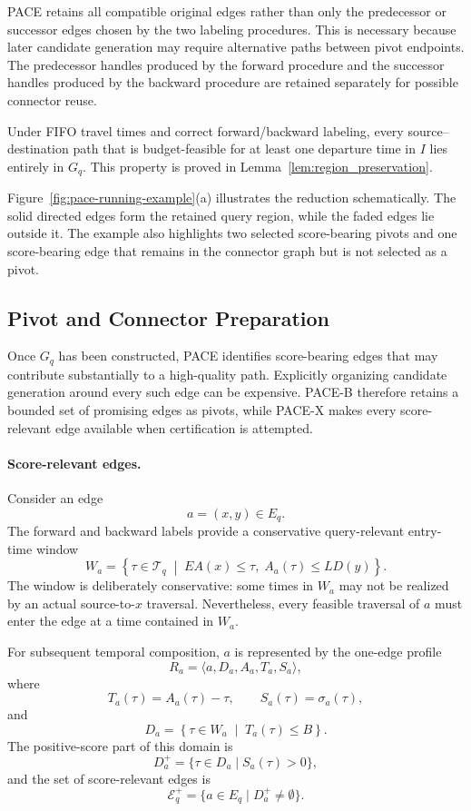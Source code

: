 \documentclass[a4paper,fleqn]{cas-dc}
\begin{document}
PACE retains all compatible original edges rather than only the predecessor
or successor edges chosen by the two labeling procedures. This is necessary
because later candidate generation may require alternative paths between
pivot endpoints. The predecessor handles produced by the forward procedure
and the successor handles produced by the backward procedure are retained
separately for possible connector reuse.

Under FIFO travel times and correct forward/backward labeling, every
source--destination path that is budget-feasible for at least one departure
time in \(I\) lies entirely in \(G_q\). This property is proved in
Lemma~\ref{lem:region_preservation}.

Figure~\ref{fig:pace-running-example}(a) illustrates the reduction
schematically. The solid directed edges form the retained query region, while
the faded edges lie outside it. The example also highlights two selected
score-bearing pivots and one score-bearing edge that remains in the connector
graph but is not selected as a pivot.

\subsection{Pivot and Connector Preparation}
\label{subsec:pace_pivots_connectors}

Once \(G_q\) has been constructed, PACE identifies score-bearing edges that
may contribute substantially to a high-quality path. Explicitly organizing
candidate generation around every such edge can be expensive. PACE-B therefore
retains a bounded set of promising edges as pivots, while PACE-X makes every
score-relevant edge available when certification is attempted.

\paragraph{Score-relevant edges.}
Consider an edge
\[
a=(x,y)\in E_q.
\]
The forward and backward labels provide a conservative query-relevant
entry-time window
\[
W_a
=
\left\{
\tau\in\mathcal{T}_q
\;\middle|\;
EA(x)\leq\tau,\;
A_a(\tau)\leq LD(y)
\right\}.
\]
The window is deliberately conservative: some times in \(W_a\) may not be
realized by an actual source-to-\(x\) traversal. Nevertheless, every feasible
traversal of \(a\) must enter the edge at a time contained in \(W_a\).

For subsequent temporal composition, \(a\) is represented by the one-edge
profile
\[
R_a
=
\langle
a,D_a,A_a,T_a,S_a
\rangle,
\]
where
\[
T_a(\tau)=A_a(\tau)-\tau,
\qquad
S_a(\tau)=\sigma_a(\tau),
\]
and
\[
D_a
=
\left\{
\tau\in W_a
\;\middle|\;
T_a(\tau)\leq B
\right\}.
\]
The positive-score part of this domain is
\[
D_a^{+}
=
\{\tau\in D_a\mid S_a(\tau)>0\},
\]
and the set of score-relevant edges is
\[
\mathcal{E}_q^{+}
=
\{a\in E_q\mid D_a^{+}\neq\emptyset\}.
\]
\end{document}
